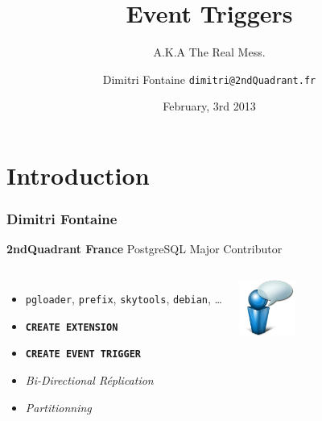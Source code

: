 \documentclass{beamer}
\title{Event Triggers}
\subtitle{A.K.A The Real Mess.}
\author{Dimitri Fontaine \texttt{dimitri@2ndQuadrant.fr}}
\date{February, 3rd 2013}
\begin{document}
\frame{\titlepage}

\section{Introduction}

\begin{frame}[fragile]
  \frametitle{Dimitri Fontaine}

  \begin{center}
    \textbf{2ndQuadrant France}
    \newline
    PostgreSQL Major Contributor
  \end{center}

  \vfill

\begin{columns}[c]

  \begin{itemize}
   \item<2-> \texttt{pgloader}, \texttt{prefix}, \texttt{skytools}, \texttt{debian}, …
   \item<2-> \texttt{\textbf{CREATE EXTENSION}}
   \item<3-> \texttt{\textbf{CREATE EVENT TRIGGER}}
   \item<3-> \textit{Bi-Directional Réplication}
   \item<4-> \textit{Partitionning}
  \end{itemize}  

\begin{center}
  \includegraphics[height=5em]{bulle-blue-icon.png}
\end{center}
\end{columns}
\end{frame}

\end{document}
